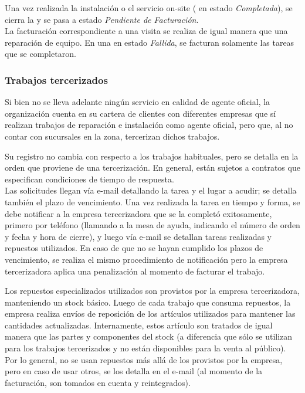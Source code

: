 \documentclass[12pt]{extarticle}
\begin{document}
\begin{spacing}{1.2}
    Una vez realizada la instalación o el servicio on-site (\OT{} en estado \textit{Completada}), se cierra la \OT{} y se pasa a estado \textit{Pendiente de Facturación}.\\

    La facturación correspondiente a una visita se realiza de igual manera que una reparación de equipo. En una \OT{} en estado \textit{Fallida}, se facturan solamente las tareas que se completaron.

    \subsubsection{Trabajos tercerizados}
    Si bien no se lleva adelante ningún servicio en calidad de agente oficial, la organización cuenta en su cartera de clientes con diferentes empresas que sí realizan trabajos de reparación e instalación como agente oficial, pero que, al no contar con sucursales en la zona, tercerizan dichos trabajos.

    Su registro no cambia con respecto a los trabajos habituales, pero se detalla en la orden que proviene de una tercerización.
    En general, están sujetos a contratos que especifican condiciones de tiempo de respuesta.\\

    Las solicitudes llegan vía e-mail detallando la tarea y el lugar a acudir; se detalla también el plazo de vencimiento.
    Una vez realizada la tarea en tiempo y forma, se debe notificar a la empresa tercerizadora que se la completó exitosamente, primero por teléfono (llamando a la mesa de ayuda, indicando el número de orden y fecha y hora de cierre), y luego vía e-mail se detallan tareas realizadas y repuestos utilizados.
    En caso de que no se hayan cumplido los plazos de vencimiento, se realiza el mismo procedimiento de notificación pero la empresa tercerizadora aplica una penalización al momento de facturar el trabajo.

    Los repuestos especializados utilizados son provistos por la empresa tercerizadora, manteniendo un stock básico. Luego de cada trabajo que consuma repuestos, la empresa realiza envíos de reposición de los artículos utilizados para mantener las cantidades actualizadas. 
    Internamente, estos artículo son tratados de igual manera que las partes y componentes del stock (a diferencia que sólo se utilizan para los trabajos tercerizados y no están disponibles para la venta al público).
    Por lo general, no se usan repuestos más allá de los provistos por la empresa, pero en caso de usar otros, se los detalla en el e-mail (al momento de la facturación, son tomados en cuenta y reintegrados).\\


\end{spacing}
\end{document}
